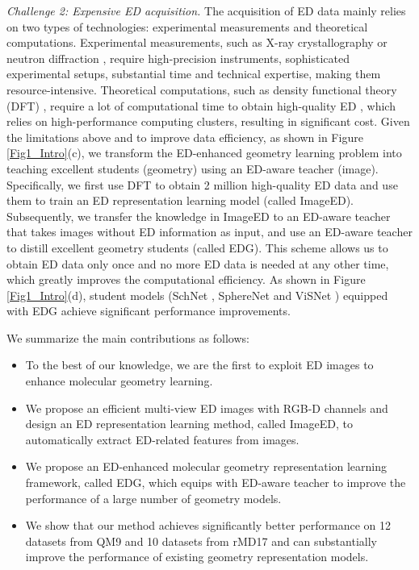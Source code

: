 \documentclass{article}
\begin{document}
\textit{Challenge 2: Expensive ED acquisition.} The acquisition of ED data mainly relies on two types of technologies: experimental measurements and theoretical computations. Experimental measurements, such as X-ray crystallography \cite{nienaber2000discovering} or neutron diffraction \cite{goncharenko2005neutron}, require high-precision instruments, sophisticated experimental setups, substantial time and technical expertise, making them resource-intensive. Theoretical computations, such as density functional theory (DFT) \cite{kohn1996density}, require a lot of computational time to obtain high-quality ED \cite{hegde2017machine,lee2024convolutional}, which relies on high-performance computing clusters, resulting in significant cost. Given the limitations above and to improve data efficiency, as shown in Figure \ref{Fig1_Intro}(c), we transform the ED-enhanced geometry learning problem into teaching excellent students (geometry) using an ED-aware teacher (image). Specifically, we first use DFT to obtain 2 million high-quality ED data and use them to train an ED representation learning model (called ImageED). Subsequently, we transfer the knowledge in ImageED to an ED-aware teacher that takes images without ED information as input, and use an ED-aware teacher to distill excellent geometry students (called EDG). This scheme allows us to obtain ED data only once and no more ED data is needed at any other time, which greatly improves the computational efficiency. As shown in Figure \ref{Fig1_Intro}(d), student models (SchNet \cite{schutt2017schnet}, SphereNet \cite{liu2022spherical} and ViSNet \cite{wang2024enhancing}) equipped with EDG achieve significant performance improvements.


We summarize the main contributions as follows:






    


\begin{itemize}[itemsep=2pt,topsep=0pt,parsep=0pt]
    \item To the best of our knowledge, we are the first to exploit ED images to enhance molecular geometry learning.
    \item We propose an efficient multi-view ED images with RGB-D channels and design an ED representation learning method, called ImageED, to automatically extract ED-related features from images.
    \item We propose an ED-enhanced molecular geometry representation learning framework, called EDG, which equips with ED-aware teacher to improve the performance of a large number of geometry models. %
    \item We show that our method achieves significantly better performance on 12 datasets from QM9 and 10 datasets from rMD17 and can substantially improve the performance of existing geometry representation models.
\end{itemize}
\end{document}
